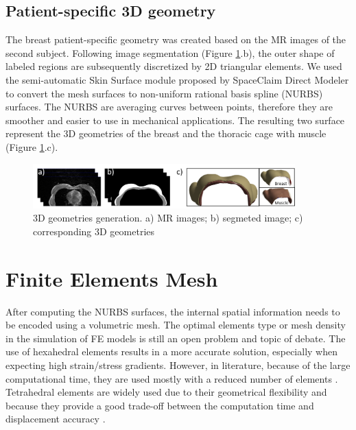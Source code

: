 \subsection{Patient-specific 3D geometry}

\label{subsection:patientspecificgeometry}

The breast patient-specific geometry was created based on the MR images of the second subject. Following image segmentation (Figure \ref{fig:3dgeometries}.b), the outer shape of labeled regions are subsequently discretized by 2D triangular elements.  We used the semi-automatic Skin Surface module proposed by SpaceClaim Direct Modeler to convert the mesh surfaces to non-uniform rational basis spline (NURBS) surfaces. The NURBS are averaging curves between points, therefore they are smoother and easier to use in mechanical applications. The resulting  two surface represent the 3D geometries of the breast and the thoracic cage with muscle  (Figure \ref{fig:3dgeometries}.c).   
 

\begin{figure}[!h]
\centering
\includegraphics[width=0.9\textwidth,keepaspectratio]{figures/3dgeometries.png} 
\caption{3D geometries generation. a) MR images; b) segmeted image; c) corresponding 3D geometries}\label{fig:3dgeometries}
\end{figure}

\section{ Finite Elements Mesh}\label{section:myFEM}

After computing the NURBS surfaces, the internal spatial information needs to be encoded using a volumetric mesh. The optimal elements type or mesh density in the simulation of FE models is still an open problem and topic of debate. The use of hexahedral elements results in a more accurate solution, especially when expecting high strain/stress gradients. However, in literature, because of the large computational time, they are used mostly with a reduced number of elements \citep{ruiter_model_based_2006,gamage_modelling_2012}. Tetrahedral elements are widely used due to their geometrical flexibility and because they provide a good trade-off between the computation time and displacement accuracy \citep{han_nonlinear_2014,palomar_finite_2008,griesenauer_breast_2017}.   


